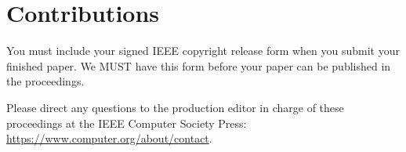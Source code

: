 \section{Contributions}

You must include your signed IEEE copyright release form when you submit your finished paper.
We MUST have this form before your paper can be published in the proceedings.

Please direct any questions to the production editor in charge of these proceedings at the IEEE Computer Society Press:
\url{https://www.computer.org/about/contact}.